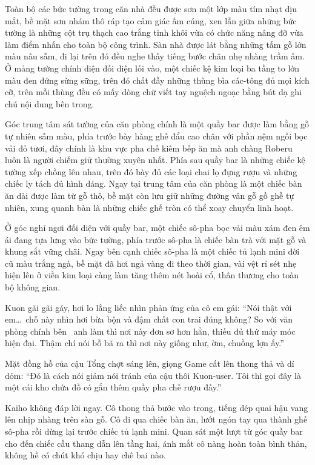 \documentclass[../main.tex]{subfiles}
\begin{document}
Toàn bộ các bức tường trong căn nhà đều được sơn một lớp màu tím nhạt dịu mắt, bề mặt sơn nhám thô ráp tạo cảm giác ấm cúng, xen lẫn giữa những bức tường là những cột trụ thạch cao trắng tinh khôi vừa có chức năng nâng đỡ vừa làm điểm nhấn cho toàn bộ công trình. Sàn nhà được lát bằng những tấm gỗ lớn màu nâu sẫm, đi lại trên đó đều nghe thấy tiếng bước chân nhẹ nhàng trầm ấm. Ở mảng tường chính diện đối diện lối vào, một chiếc kệ kim loại ba tầng to lớn màu đen đứng sừng sững, trên đó chất đầy những thùng bìa các-tông đủ mọi kích cỡ, trên mỗi thùng đều có mấy dòng chữ viết tay nguệch ngoạc bằng bút dạ ghi chú nội dung bên trong.

Góc trung tâm sát tường của căn phòng chính là một quầy bar được làm bằng gỗ tự nhiên sẫm màu, phía trước bày hàng ghế đẩu cao chân với phần nệm ngồi bọc vải đỏ tươi, đây chính là khu vực pha chế kiêm bếp ăn mà anh chàng Roberu luôn là người chiếm giữ thường xuyên nhất. Phía sau quầy bar là những chiếc kệ tường xếp chồng lên nhau, trên đó bày đủ các loại chai lọ đựng rượu và những chiếc ly tách đủ hình dáng. Ngay tại trung tâm của căn phòng là một chiếc bàn ăn dài được làm từ gỗ thô, bề mặt còn lưu giữ những đường vân gỗ gồ ghề tự nhiên, xung quanh bàn là những chiếc ghế tròn có thể xoay chuyển linh hoạt.

Ở góc nghỉ ngơi đối diện với quầy bar, một chiếc sô-pha bọc vải màu xám đen êm ái đang tựa lưng vào bức tường, phía trước sô-pha là chiếc bàn trà với mặt gỗ và khung sắt vững chãi. Ngay bên cạnh chiếc sô-pha là một chiếc tủ lạnh mini đời cũ màu trắng ngà, bề mặt đã hơi ngả vàng đi theo thời gian, vài vệt rỉ sét nhẹ hiện lên ở viền kim loại càng làm tăng thêm nét hoài cổ, thân thương cho toàn bộ không gian.

Kuon gãi gãi gáy, hơi lo lắng liếc nhìn phản ứng của cô em gái: ``Nói thật với em\dots\ chỗ này nhìn hơi bừa bộn và đậm chất con trai đúng không? So với văn phòng chính bên \hll\ anh làm thì nơi này đơn sơ hơn hẳn, thiếu đủ thứ máy móc hiện đại. Thậm chí nói bỗ bã ra thì nơi này giống như, ờm, chuồng lợn ấy.''

Mặt đồng hồ của cậu Tổng chợt sáng lên, giọng Game cất lên thong thả và dí dỏm: ``Đó là cách nói giảm nói tránh của cậu thôi Kuon-user. Tôi thì gọi đây là một cái kho chứa đồ có gắn thêm quầy pha chế rượu đấy.''

Kaiho không đáp lời ngay. Cô thong thả bước vào trong, tiếng dép quai hậu vang lên nhịp nhàng trên sàn gỗ. Cô đi qua chiếc bàn ăn, lướt ngón tay qua thành ghế sô-pha rồi dừng lại trước chiếc tủ lạnh mini. Quan sát một lượt từ góc quầy bar cho đến chiếc cầu thang dẫn lên tầng hai, ánh mắt cô nàng hoàn toàn bình thản, không hề có chút khó chịu hay chê bai nào.
\end{document}
